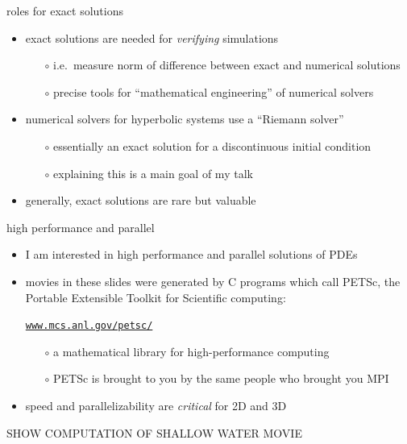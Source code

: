 \documentclass[10pt,hyperref,dvipsnames]{beamer}
\begin{document}
\begin{frame}{roles for exact solutions}

\begin{itemize}
\item exact solutions are needed for \emph{verifying} simulations
    \begin{itemize}
    \item[$\circ$] i.e.~measure norm of difference between exact and numerical solutions
    \item[$\circ$] precise tools for ``mathematical engineering'' of numerical solvers
    \end{itemize}
\item numerical solvers for hyperbolic systems use a ``Riemann solver'' 
    \begin{itemize}
    \item[$\circ$] essentially an exact solution for a discontinuous initial condition
    \item[$\circ$] explaining this is a main goal of my talk
    \end{itemize}
\item generally, exact solutions are rare but valuable
\end{itemize}
\end{frame}


\begin{frame}{high performance and parallel}

\begin{itemize}
\item I am interested in high performance and parallel solutions of PDEs
\item movies in these slides were generated by C programs which call PETSc, the Portable Extensible Toolkit for Scientific computing:

    \begin{center}
    \href{https://www.mcs.anl.gov/petsc/}{\texttt{www.mcs.anl.gov/petsc/}}
    \end{center}

    \begin{itemize}
    \item[$\circ$] a mathematical library for high-performance computing
    \item[$\circ$] PETSc is brought to you by the same people who brought you MPI
    \end{itemize}
\item speed and parallelizability are \emph{critical} for 2D and 3D
\end{itemize}

\vspace{10mm}
\begin{center}
\alert{SHOW COMPUTATION OF SHALLOW WATER MOVIE}
\end{center}

\end{frame}
\end{document}
